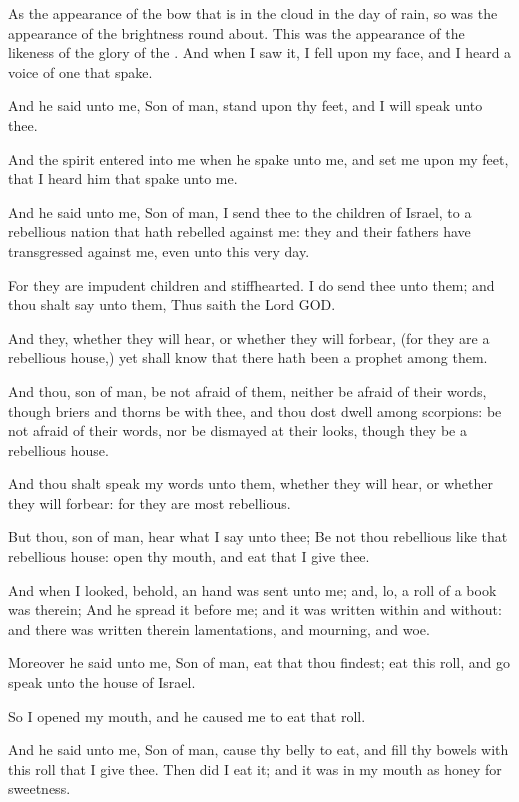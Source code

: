 \Verse As the appearance of the bow that is in the cloud in the day of rain, so was the appearance of the brightness round about. This was the appearance of the likeness of the glory of the \LORD. And when I saw it, I fell upon my face, and I heard a voice of one that spake.


\Chapter
\Verse And he said unto me, Son of man, stand upon thy feet, and I will speak unto thee.

\Verse And the spirit entered into me when he spake unto me, and set me upon my feet, that I heard him that spake unto me.

\Verse And he said unto me, Son of man, I send thee to the children of Israel, to a rebellious nation that hath rebelled against me: they and their fathers have transgressed against me, even unto this very day.

\Verse For they are impudent children and stiffhearted. I do send thee unto them; and thou shalt say unto them, Thus saith the Lord GOD.

\Verse And they, whether they will hear, or whether they will forbear, (for they are a rebellious house,) yet shall know that there hath been a prophet among them.

\Verse And thou, son of man, be not afraid of them, neither be afraid of their words, though briers and thorns be with thee, and thou dost dwell among scorpions: be not afraid of their words, nor be dismayed at their looks, though they be a rebellious house.

\Verse And thou shalt speak my words unto them, whether they will hear, or whether they will forbear: for they are most rebellious.

\Verse But thou, son of man, hear what I say unto thee; Be not thou rebellious like that rebellious house: open thy mouth, and eat that I give thee.

\Verse And when I looked, behold, an hand was sent unto me; and, lo, a roll of a book was therein; \Verse And he spread it before me; and it was written within and without: and there was written therein lamentations, and mourning, and woe.


\Chapter
\Verse Moreover he said unto me, Son of man, eat that thou findest; eat this roll, and go speak unto the house of Israel.

\Verse So I opened my mouth, and he caused me to eat that roll.

\Verse And he said unto me, Son of man, cause thy belly to eat, and fill thy bowels with this roll that I give thee. Then did I eat it; and it was in my mouth as honey for sweetness.

